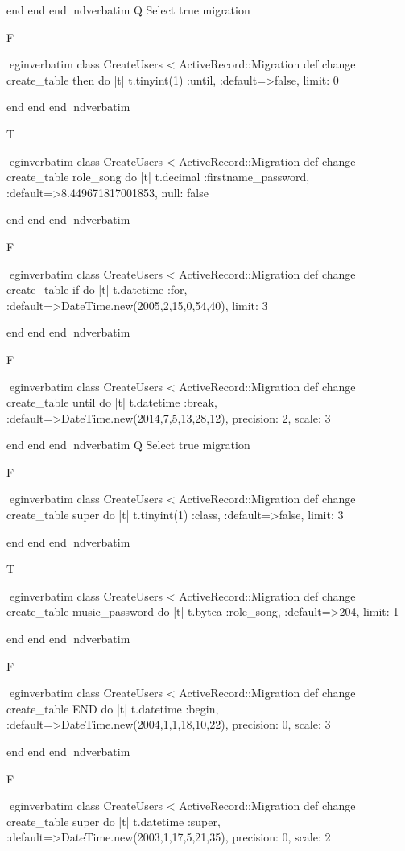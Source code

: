     end 
  end 
end
nd{verbatim}
Q
 Select true migration

F

egin{verbatim}
 class CreateUsers < ActiveRecord::Migration 
  def change 
    create_table then do |t| 
      t.tinyint(1) :until, :default=>false, limit: 0
    
    end 
  end 
end
nd{verbatim}

T

egin{verbatim}
 class CreateUsers < ActiveRecord::Migration 
  def change 
    create_table role_song do |t| 
      t.decimal :firstname_password, :default=>8.449671817001853, null: false
    
    end 
  end 
end
nd{verbatim}

F

egin{verbatim}
 class CreateUsers < ActiveRecord::Migration 
  def change 
    create_table if do |t| 
      t.datetime :for, :default=>DateTime.new(2005,2,15,0,54,40), limit: 3
    
    end 
  end 
end
nd{verbatim}

F

egin{verbatim}
 class CreateUsers < ActiveRecord::Migration 
  def change 
    create_table until do |t| 
      t.datetime :break, :default=>DateTime.new(2014,7,5,13,28,12), precision: 2, scale: 3
    
    end 
  end 
end
nd{verbatim}
Q
 Select true migration

F

egin{verbatim}
 class CreateUsers < ActiveRecord::Migration 
  def change 
    create_table super do |t| 
      t.tinyint(1) :class, :default=>false, limit: 3
    
    end 
  end 
end
nd{verbatim}

T

egin{verbatim}
 class CreateUsers < ActiveRecord::Migration 
  def change 
    create_table music_password do |t| 
      t.bytea :role_song, :default=>204, limit: 1
    
    end 
  end 
end
nd{verbatim}

F

egin{verbatim}
 class CreateUsers < ActiveRecord::Migration 
  def change 
    create_table END do |t| 
      t.datetime :begin, :default=>DateTime.new(2004,1,1,18,10,22), precision: 0, scale: 3
    
    end 
  end 
end
nd{verbatim}

F

egin{verbatim}
 class CreateUsers < ActiveRecord::Migration 
  def change 
    create_table super do |t| 
      t.datetime :super, :default=>DateTime.new(2003,1,17,5,21,35), precision: 0, scale: 2
    

